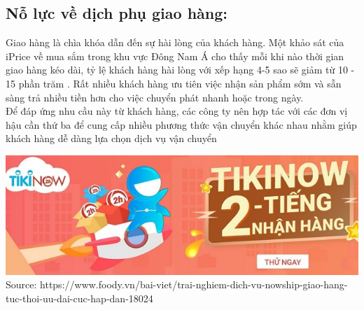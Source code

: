\documentclass[13pt,a4paper]{article}
\begin{document}
    \subsection{Nỗ lực về dịch phụ giao hàng:}
    Giao hàng là chìa khóa dẫn đến sự hài lòng của khách hàng. Một khảo sát của iPrice về mua sắm trong khu vực Đông Nam Á cho thấy mỗi khi nào thời gian giao hàng kéo dài, tỷ lệ khách hàng hài lòng với xếp hạng 4-5 sao sẽ giảm từ 10 - 15 phần trăm . Rất nhiều khách hàng ưu tiên việc nhận sản phẩm sớm và sẵn sàng trả nhiều tiền hơn cho việc chuyển phát nhanh hoặc trong ngày.\\
    Để đáp ứng nhu cầu này từ khách hàng, các công ty nên hợp tác với các đơn vị hậu cần thứ ba để cung cấp nhiều phương thức vận chuyển khác nhau nhằm giúp khách hàng dễ dàng lựa chọn dịch vụ vận chuyển
    \begin{center}
    \includegraphics[scale=0.63]{images/giaohang.png} \\
    \fontsize{10pt}{1.2pt}\selectfont
    Source: https://www.foody.vn/bai-viet/trai-nghiem-dich-vu-nowship-giao-hang-tuc-thoi-uu-dai-cuc-hap-dan-18024
    \end{center}
\end{document}
